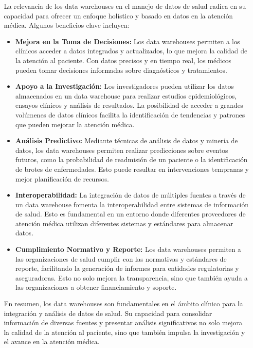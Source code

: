 \documentclass[12pt, a4paper, twoside]{article}
\begin{document}
	La relevancia de los data warehouses en el manejo de datos de salud radica en su capacidad para ofrecer un enfoque holístico y basado en datos en la atención médica. Algunos beneficios clave incluyen:
	
	\begin{itemize}
		\item \textbf{Mejora en la Toma de Decisiones:} Los data warehouses permiten a los clínicos acceder a datos integrados y actualizados, lo que mejora la calidad de la atención al paciente. Con datos precisos y en tiempo real, los médicos pueden tomar decisiones informadas sobre diagnósticos y tratamientos.
		
		\item \textbf{Apoyo a la Investigación:} Los investigadores pueden utilizar los datos almacenados en un data warehouse para realizar estudios epidemiológicos, ensayos clínicos y análisis de resultados. La posibilidad de acceder a grandes volúmenes de datos clínicos facilita la identificación de tendencias y patrones que pueden mejorar la atención médica.
		
		\item \textbf{Análisis Predictivo:} Mediante técnicas de análisis de datos y minería de datos, los data warehouses permiten realizar predicciones sobre eventos futuros, como la probabilidad de readmisión de un paciente o la identificación de brotes de enfermedades. Esto puede resultar en intervenciones tempranas y mejor planificación de recursos.
		
		\item \textbf{Interoperabilidad:} La integración de datos de múltiples fuentes a través de un data warehouse fomenta la interoperabilidad entre sistemas de información de salud. Esto es fundamental en un entorno donde diferentes proveedores de atención médica utilizan diferentes sistemas y estándares para almacenar datos.
		
		\item \textbf{Cumplimiento Normativo y Reporte:} Los data warehouses permiten a las organizaciones de salud cumplir con las normativas y estándares de reporte, facilitando la generación de informes para entidades regulatorias y aseguradoras. Esto no solo mejora la transparencia, sino que también ayuda a las organizaciones a obtener financiamiento y soporte.
		
	\end{itemize}

	En resumen, los data warehouses son fundamentales en el ámbito clínico para la integración y análisis de datos de salud. Su capacidad para consolidar información de diversas fuentes y presentar análisis significativos no solo mejora la calidad de la atención al paciente, sino que también impulsa la investigación y el avance en la atención médica.
\end{document}

